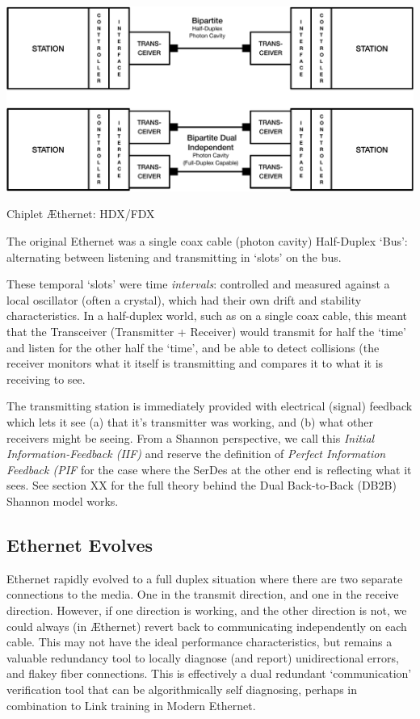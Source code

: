   
     \begin{marginfigure}
  \includegraphics[width=1.2\linewidth]{../../FIGURES/Bipartite.pdf}
  \caption{Chiplet Æthernet: HDX/FDX}
  \vspace{1em}
\end{marginfigure}
   
The original Ethernet was a single coax cable (photon cavity) Half-Duplex `Bus':  alternating between listening and transmitting in `slots' on the bus.
\bigskip
 
These temporal `slots' were time \emph{intervals}: controlled and measured against a local oscillator (often a crystal), which had their own drift and stability characteristics. In a half-duplex world, such as on a single coax cable, this meant that the Transceiver (Transmitter + Receiver) would transmit for half the `time' and listen for the other half the `time', and be able to detect collisions (the receiver monitors what it itself is transmitting and compares it to what it is receiving to see. 

The transmitting station is immediately provided with electrical (signal) feedback which lets it see (a) that it's transmitter  was working, and (b) what other receivers might be seeing. From a Shannon perspective, we call this \emph{Initial Information-Feedback (IIF)} and reserve the definition of \emph{Perfect Information Feedback (PIF} for the case where the SerDes at the other end is reflecting what it sees.  See section XX for the full theory behind the Dual Back-to-Back (DB2B) Shannon model works.

\subsection{Ethernet Evolves}

Ethernet rapidly evolved to a full duplex situation where there are two separate connections to the media.  One in the transmit direction, and one in the receive direction. However, if one direction is working, and the other direction is not, we could always (in Æthernet) revert back to communicating independently on each cable.  This may not have the ideal performance characteristics, but remains a valuable redundancy tool to locally diagnose (and report) unidirectional errors, and flakey fiber connections. This is effectively a dual redundant `communication' verification tool that can be algorithmically self diagnosing, perhaps in combination to Link training in Modern Ethernet. 

